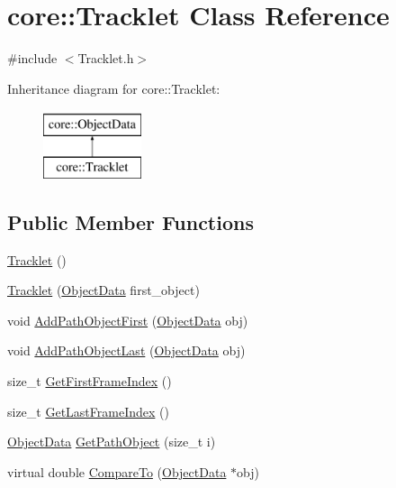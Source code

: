 \hypertarget{classcore_1_1Tracklet}{}\section{core\+:\+:Tracklet Class Reference}
\label{classcore_1_1Tracklet}


{\ttfamily \#include $<$Tracklet.\+h$>$}

Inheritance diagram for core\+:\+:Tracklet\+:\begin{figure}[H]
\begin{center}
\leavevmode
\includegraphics[height=2.000000cm]{classcore_1_1Tracklet}
\end{center}
\end{figure}
\subsection*{Public Member Functions}
\begin{DoxyCompactItemize}
\item 
\hyperlink{classcore_1_1Tracklet_aedf59b5a9a068a28bb7570f2a031d4e7}{Tracklet} ()
\item 
\hyperlink{classcore_1_1Tracklet_a5a91e01f9cd8404915dce73a0d659064}{Tracklet} (\hyperlink{classcore_1_1ObjectData}{Object\+Data} first\+\_\+object)
\item 
void \hyperlink{classcore_1_1Tracklet_ac7f660efeed15a8925482d8d63073bcf}{Add\+Path\+Object\+First} (\hyperlink{classcore_1_1ObjectData}{Object\+Data} obj)
\item 
void \hyperlink{classcore_1_1Tracklet_ad9f018cb26a5fcb1ab00c8f336f24de5}{Add\+Path\+Object\+Last} (\hyperlink{classcore_1_1ObjectData}{Object\+Data} obj)
\item 
size\+\_\+t \hyperlink{classcore_1_1Tracklet_ae544127ff912eefeb3698e94da27f91e}{Get\+First\+Frame\+Index} ()
\item 
size\+\_\+t \hyperlink{classcore_1_1Tracklet_abbfc0ac1abd459962142ee96def46731}{Get\+Last\+Frame\+Index} ()
\item 
\hyperlink{classcore_1_1ObjectData}{Object\+Data} \hyperlink{classcore_1_1Tracklet_a95387d8a86e5b81b5cc1ff479c96494c}{Get\+Path\+Object} (size\+\_\+t i)
\item 
virtual double \hyperlink{classcore_1_1Tracklet_ab45f28ba6abde0944820ac614560ea89}{Compare\+To} (\hyperlink{classcore_1_1ObjectData}{Object\+Data} $\ast$obj)
\end{DoxyCompactItemize}
